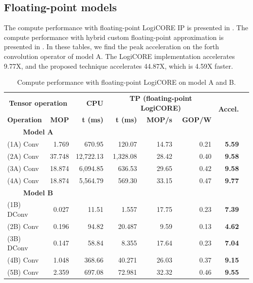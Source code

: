 \subsection{Floating-point models}
The compute performance with floating-point LogiCORE IP is presented in . The compute performance with hybrid custom floating-point approximation is presented in . In these tables, we find the peak acceleration on the forth convolution operator of model A. The LogiCORE implementation accelerates 9.77X, and the proposed technique accelerates 44.87X, which is 4.59X faster.


\begin{table}[!htp]\centering
	\caption{Compute performance with floating-point LogiCORE on model A and B.}\label{tab:performace_float_logicore}
	\scriptsize
	\begin{tabular}{lrrrrrrr}\toprule
		\multicolumn{2}{c}{\textbf{Tensor operation}} &\textbf{CPU} &\multicolumn{3}{c}{\textbf{TP (floating-point LogiCORE)}} &\multirow{2}{*}{\textbf{Accel.}} \\\cmidrule{1-6}
		\textbf{Operation} &\textbf{MOP} &\textbf{t (ms)} &\textbf{t (ms)} &\textbf{MOP/s} &\textbf{GOP/W} & \\\midrule
		\multicolumn{2}{c}{\textbf{Model A}} & & & & & \\
		(1A) Conv &1.769 &670.95 &120.07 &14.73 &0.21 &\textbf{5.59} \\
		(2A) Conv &37.748 &12,722.13 &1,328.08 &28.42 &0.40 &\textbf{9.58} \\
		(3A) Conv &18.874 &6,094.85 &636.53 &29.65 &0.42 &\textbf{9.58} \\
		(4A) Conv &18.874 &5,564.79 &569.30 &33.15 &0.47 &\textbf{9.77} & \\\midrule
		\multicolumn{2}{c}{\textbf{Model B}} & & & & & \\
		(1B) DConv &0.027 &11.51 &1.557 &17.75 &0.23 &\textbf{7.39} \\
		(2B) Conv &0.196 &94.82 &20.487 &9.59 &0.13 &\textbf{4.62} \\
		(3B) DConv &0.147 &58.84 &8.355 &17.64 &0.23 &\textbf{7.04} \\
		(4B) Conv &1.048 &368.66 &40.271 &26.03 &0.37 &\textbf{9.15} \\
		(5B) Conv &2.359 &697.08 &72.981 &32.32 &0.46 &\textbf{9.55} \\
		\bottomrule
	\end{tabular}
\end{table}

